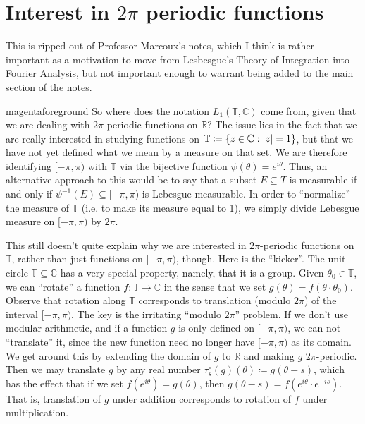 \documentclass[notoc,notitlepage]{tufte-book}
\begin{document}
\appendix

\chapter{Interest in \texorpdfstring{$2 \pi$}{2pi} periodic functions}%
\label{chp:interest_in_2_pi_periodic_functions}

This is ripped out of Professor Marcoux's \cite{marcoux2019} notes,
which I think is rather important as a motivation to move from
Lesbesgue's Theory of Integration into Fourier Analysis,
but not important enough to warrant being added to the
main section of the notes.
\begin{quotebox}{magenta}{foreground}
So where does the notation $L_1 (\mathbb{T}, \mathbb{C})$ come from,
given that we are dealing with $2 \pi$-periodic functions on $\mathbb{R}$?
The issue lies in the fact that we are really interested in studying functions
on $\mathbb{T} \coloneqq \{z \in \mathbb{C} : \left|z\right| = 1\}$,
but that we have not yet defined what we mean by a measure on that set.
We are therefore identifying $[-\pi, \pi)$ with $\mathbb{T}$ via
the bijective function $\psi(\theta) = e^{i \theta}$.
Thus, an alternative approach to this would be to say that
a subset $E \subseteq T$ is measurable if and only if
$\psi^{-1}(E) \subseteq [-\pi, \pi)$ is Lebesgue measurable.
In order to ``normalize'' the measure of $\mathbb{T}$
(i.e. to make its measure equal to 1),
we simply divide Lebesgue measure on $[-\pi, \pi)$ by $2 \pi$.

This still doesn't quite explain why we are interested in $2 \pi$-periodic functions
on $\mathbb{T}$, rather than just functions on $[-\pi, \pi)$, though.
Here is the ``kicker''.
The unit circle $\mathbb{T} \subseteq \mathbb{C}$ has a very special property,
namely, that it is a group.
Given $\theta_0 \in \mathbb{T}$, we can ``rotate'' a function
$f : \mathbb{T} \to \mathbb{C}$ in the sense that we set
$g(\theta) = f (\theta \cdot \theta_0 )$.
Observe that rotation along $\mathbb{T}$ corresponds to translation
(modulo $2 \pi$) of the interval $[-\pi, \pi)$.
The key is the irritating ``modulo $2 \pi$'' problem.
If we don't use modular arithmetic, and if a function $g$ is only defined
on $[-\pi, \pi)$, we can not ``translate'' it,
since the new function need no longer have $[-\pi, \pi)$ as its domain.
We get around this by extending the domain of $g$ to $\mathbb{R}$
and making $g$ $2 \pi$-periodic.
Then we may translate $g$ by any real number
$\tau_s^\circ(g)(\theta) \coloneqq g(\theta - s)$,
which has the effect that if we set $f (e^{i \theta}) = g(\theta)$,
then $g(\theta - s) = f (e^{i \theta} \cdot e^{-is})$.
That is, translation of $g$ under addition corresponds to
rotation of $f$ under multiplication.


\end{quotebox}
\end{document}
